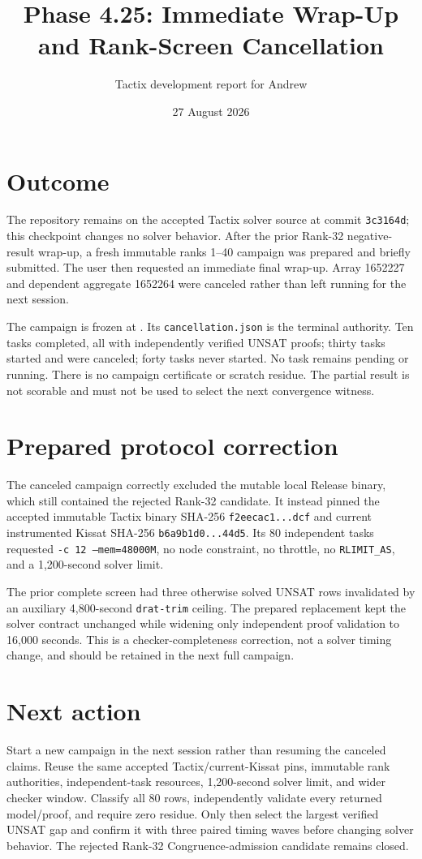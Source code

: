 \documentclass[11pt]{article}
\title{Phase 4.25: Immediate Wrap-Up and Rank-Screen Cancellation}
\author{Tactix development report for Andrew}
\date{27 August 2026}
\newcommand{\code}[1]{\texttt{#1}}
\begin{document}
\maketitle

\section{Outcome}

The repository remains on the accepted Tactix solver source at commit
\code{3c3164d}; this checkpoint changes no solver behavior.  After the prior
Rank-32 negative-result wrap-up, a fresh immutable ranks 1--40 campaign was
prepared and briefly submitted.  The user then requested an immediate final
wrap-up.  Array 1652227 and dependent aggregate 1652264 were canceled rather
than left running for the next session.

The campaign is frozen at
.
Its \code{cancellation.json} is the terminal authority.  Ten tasks completed,
all with independently verified UNSAT proofs; thirty tasks started and were
canceled; forty tasks never started.  No task remains pending or running.
There is no campaign certificate or scratch residue.  The partial result is
not scorable and must not be used to select the next convergence witness.

\section{Prepared protocol correction}

The canceled campaign correctly excluded the mutable local Release binary,
which still contained the rejected Rank-32 candidate.  It instead pinned the
accepted immutable Tactix binary SHA-256 \code{f2eecac1...dcf} and current
instrumented Kissat SHA-256 \code{b6a9b1d0...44d5}.  Its 80 independent tasks
requested \code{-c 12 --mem=48000M}, no node constraint, no throttle, no
\code{RLIMIT\_AS}, and a 1,200-second solver limit.

The prior complete screen had three otherwise solved UNSAT rows invalidated by
an auxiliary 4,800-second \code{drat-trim} ceiling.  The prepared replacement
kept the solver contract unchanged while widening only independent proof
validation to 16,000 seconds.  This is a checker-completeness correction, not
a solver timing change, and should be retained in the next full campaign.

\section{Next action}

Start a new campaign in the next session rather than resuming the canceled
claims.  Reuse the same accepted Tactix/current-Kissat pins, immutable rank
authorities, independent-task resources, 1,200-second solver limit, and wider
checker window.  Classify all 80 rows, independently validate every returned
model/proof, and require zero residue.  Only then select the largest verified
UNSAT gap and confirm it with three paired timing waves before changing solver
behavior.  The rejected Rank-32 Congruence-admission candidate remains closed.
\end{document}
